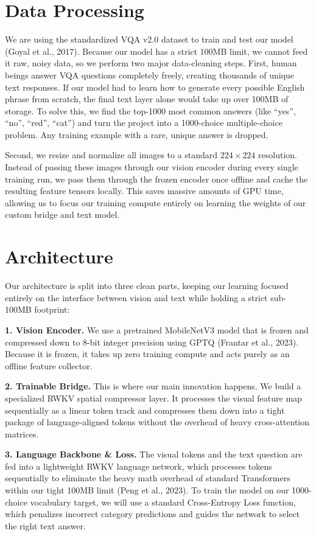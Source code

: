 \documentclass[final]{article}
\begin{document}
\section*{Data Processing}

We are using the standardized VQA v2.0 dataset to train and test our model (Goyal et al.,
2017). Because our model has a strict 100MB limit, we cannot feed it raw, noisy data, so we
perform two major data-cleaning steps. First, human beings answer VQA questions completely
freely, creating thousands of unique text responses. If our model had to learn how to generate
every possible English phrase from scratch, the final text layer alone would take up over 100MB
of storage. To solve this, we find the top-1000 most common answers (like ``yes'', ``no'',
``red'', ``cat'') and turn the project into a 1000-choice multiple-choice problem. Any training
example with a rare, unique answer is dropped.

Second, we resize and normalize all images to a standard $224\times224$ resolution. Instead of
passing these images through our vision encoder during every single training run, we pass them
through the frozen encoder once offline and cache the resulting feature tensors locally. This
saves massive amounts of GPU time, allowing us to focus our training compute entirely on
learning the weights of our custom bridge and text model.

\section*{Architecture}

Our architecture is split into three clean parts, keeping our learning focused entirely on the
interface between vision and text while holding a strict sub-100MB footprint:

\textbf{1. Vision Encoder.} We use a pretrained MobileNetV3 model that is frozen and compressed
down to 8-bit integer precision using GPTQ (Frantar et al., 2023). Because it is frozen, it
takes up zero training compute and acts purely as an offline feature collector.

\textbf{2. Trainable Bridge.} This is where our main innovation happens. We build a specialized
RWKV spatial compressor layer. It processes the visual feature map sequentially as a linear
token track and compresses them down into a tight package of language-aligned tokens without
the overhead of heavy cross-attention matrices.

\textbf{3. Language Backbone \& Loss.} The visual tokens and the text question are fed into a
lightweight RWKV language network, which processes tokens sequentially to eliminate the heavy
math overhead of standard Transformers within our tight 100MB limit (Peng et al., 2023). To
train the model on our 1000-choice vocabulary target, we will use a standard Cross-Entropy Loss
function, which penalizes incorrect category predictions and guides the network to select the
right text answer.
\end{document}
